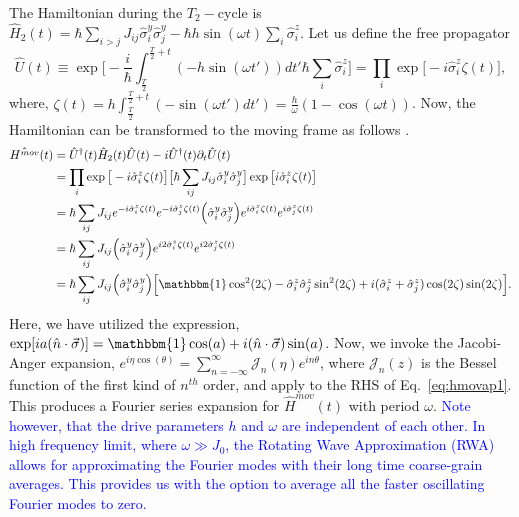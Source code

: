 \documentclass[12pt]{iopart}
\newcommand{\blue}[1]{\textcolor{blue}{#1}}
\begin{document}
The Hamiltonian during the $T_2-$cycle is $\displaystyle \hat{H}_2(t) = \hbar\sum_{i>j} J_{ij}\hat{\sigma}^y_i\hat{\sigma}^y_j - \hbar h \sin(\omega t) \sum_i \hat{\sigma}^z_i$. Let us define the free propagator 
\begin{equation}
    \hat{U}(t) \equiv \exp \bigg[-\frac{i}{\hbar}\int_{\frac{T}{2}}^{\frac{T}{2}+t} (-h \sin(\omega t'))dt' \hbar\sum_i\hat{\sigma}^z_i\bigg]
    =\prod_{i} \exp\big[-i \hat{\sigma}^z_i\zeta(t)\big],
\end{equation}
where, $\displaystyle \zeta (t) = h\int_{\frac{T}{2}}^{\frac{T}{2}+t}  (-\sin(\omega t')dt') =\frac{h}{\omega}(1-\cos(\omega t))$.
Now, the Hamiltonian can be transformed to the moving frame as follows \cite{haldar_statistical_2022}.
\begin{align}
    \hat{H^{mov}}(t) &= \hat{U}^\dagger(t) \hat{H}_2(t) \hat{U}(t)- i \hat{U}^\dagger(t) \partial_t \hat{U}(t) \nonumber\\
    &= \prod_{i} \exp\big[-i\hat{\sigma}^z_i \zeta(t)\big] \big[\hbar\sum_{ij}J_{ij}\hat{\sigma}^y_i\hat{\sigma}^y_j\big] \exp\big[ i\hat{\sigma}^z_i \zeta(t)\big]\nonumber\\
    &= \hbar\sum_{ij} J_{ij} e^{-i\hat{\sigma}^z_i \zeta(t)} e^{-i\hat{\sigma}^z_j  \zeta(t)}\Big(\hat{\sigma}^y_i\hat{\sigma}^y_j\Big)e^{i\hat{\sigma}^z_i \zeta(t)} e^{i\hat{\sigma}^z_j \zeta(t)}\nonumber\\
    &= \hbar\sum_{ij} J_{ij} \Big(\hat{\sigma}^y_i\hat{\sigma}^y_j\Big)e^{i2\hat{\sigma}^z_i \zeta(t)} e^{i2\hat{\sigma}^z_j \zeta(t)}\nonumber\\
    &= \hbar\sum_{ij} J_{ij} \Big(\hat{\sigma}^y_i\hat{\sigma}^y_j\Big) \Big[\mathbbm{1}\cos^2(2\zeta) -\hat{\sigma}^z_i\hat{\sigma}^z_j \sin^2(2\zeta) + i (\hat{\sigma}^z_i + \hat{\sigma}^z_j)\cos(2\zeta)\sin(2\zeta)\Big].
    \label{eq:hmovap1}
\end{align}
Here, we have utilized the expression, $\displaystyle \exp[ia(\hat{n}\cdot\vec{\sigma})] = \mathbbm{1} \cos(a) + i (\hat{n}\cdot\vec{\sigma})\sin(a)$. Now, we invoke the Jacobi-Anger expansion, $e^{i\eta \cos(\theta)} = \sum_{n=-\infty}^{\infty}\mathcal{J}_n(\eta)e^{in\theta}$, where $\mathcal{J}_n(z)$ is the Bessel function of the first kind of $n^{th}$ order, and apply to the RHS of  Eq.~\ref{eq:hmovap1}. This produces a Fourier series expansion for 
$\hat{H}^{mov}(t)$ with period $\omega$. \blue{Note however, that the drive parameters $h$ and $\omega$ are independent of each other. In high frequency limit, where $\omega \gg J_0$, the Rotating Wave Approximation (RWA) allows for approximating the Fourier modes with their long time coarse-grain averages. This provides us with the option to average all the faster oscillating Fourier modes to zero.}
\end{document}

